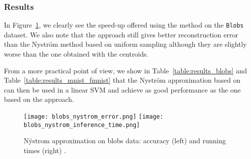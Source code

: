 \subsubsection{Results}

In Figure~\ref{fig:nystrom:blobs}, we clearly see the speed-up offered using the \qkmeans method on the \texttt{Blobs} dataset. We also note that the \qkmeans approach still gives better reconstruction error than the Nyström method based on uniform sampling although they are slightly worse than the one obtained with the \kmeans centroids. 

From a more practical point of view, we show in Table~\ref{table:results_blobs} and Table~\ref{table:results_mnist_fmnist} that the Nyström approximation based on \qkmeans can then be used in a linear SVM and achieve as good performance as the one based on the \kmeans approach.

\begin{figure}[tbh]
\centering
\texttt{[image: blobs\_nystrom\_error.png]}
\texttt{[image: blobs\_nystrom\_inference\_time.png]}

\caption{N\"ystrom approximation on blobs data: accuracy (left) and running times (right) .}
\label{fig:nystrom:blobs}
\end{figure}




